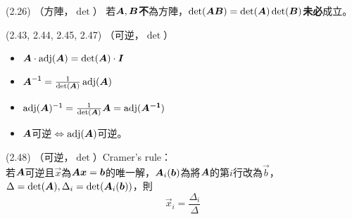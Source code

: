 
\item \begin{theorem}{(2.26)} （方陣，$\det$）
    若$\boldsymbol{A}, \boldsymbol{B}$\textbf{不}為方陣，$\det(\boldsymbol{AB}) = \det(\boldsymbol{A})\det(\boldsymbol{B})$\textbf{未必}成立。
\end{theorem}

\item \begin{theorem}{(2.43, 2.44, 2.45, 2.47)} （可逆，$\det$）
    \begin{itemize}
        \item $\boldsymbol{A} \cdot \operatorname{adj}(\boldsymbol{A}) = \det(\boldsymbol{A}) \cdot \boldsymbol{I}$
        \item $\boldsymbol{A}^{\mathsf{-1}} = \frac{1}{\det(\boldsymbol{A})}\operatorname{adj}(\boldsymbol{A})$
        \item $\operatorname{adj}(\boldsymbol{A})^{\mathsf{-1}} = \frac{1}{\det(\boldsymbol{A})}\boldsymbol{A} = \operatorname{adj}(\boldsymbol{A^{\mathsf{-1}}})$
        \item $\boldsymbol{A}$可逆$\iff$$\operatorname{adj}(\boldsymbol{A})$可逆。
    \end{itemize}
\end{theorem}

\item \begin{theorem}{(2.48)} （可逆，$\det$）Cramer's rule： \\
    若$\boldsymbol{A}$可逆且$\vec{x}$為$\boldsymbol{A}\boldsymbol{x} = \boldsymbol{b}$的唯一解，$\boldsymbol{A}_i(\boldsymbol{b})$為將$\boldsymbol{A}$的第$i$行改為$\vec{b}$，$\Delta = \det(\boldsymbol{A}), \Delta_i = \det(\boldsymbol{A}_i(\boldsymbol{b}))$，則
    \begin{equation}
        \vec{x}_i = \frac{\Delta_i}{\Delta}
    \end{equation}
\end{theorem}
